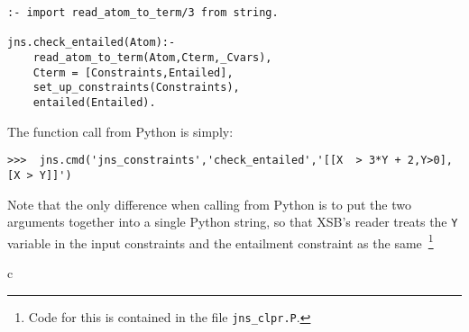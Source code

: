\begin{example}
{\small
\begin{verbatim}
:- import read_atom_to_term/3 from string.

jns.check_entailed(Atom):-
    read_atom_to_term(Atom,Cterm,_Cvars),
    Cterm = [Constraints,Entailed],
    set_up_constraints(Constraints),
    entailed(Entailed).
\end{verbatim}
}

The function call from Python is simply:

\begin{verbatim}
>>>  jns.cmd('jns_constraints','check_entailed','[[X  > 3*Y + 2,Y>0],[X > Y]]')
\end{verbatim}
\noindent
Note that the only difference when calling from Python is to put the
two arguments together into a single Python string, so that XSB's
reader treats the {\tt Y} variable in the input constraints and the
entailment constraint as the same~\footnote{Code for this is contained
  in the file {\tt jns\_clpr.P}.}
\end{example}


%
%
%
c%

